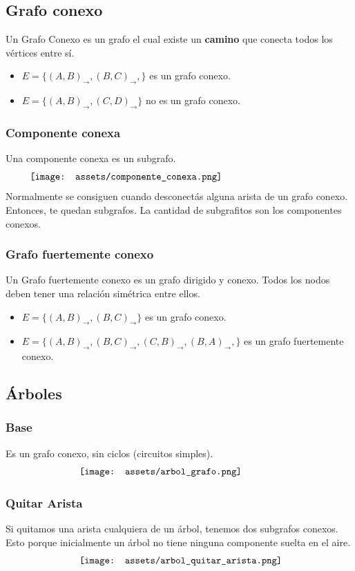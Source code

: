 \documentclass[10pt,a4paper]{article}
\begin{document}
\subsection*{Grafo conexo}
Un Grafo Conexo es un grafo el cual existe un \textbf{camino} que conecta todos los vértices entre sí. 
\begin{itemize}
    \item $E = \{(A,B)_{\rightarrow}, (B, C)_{\rightarrow}, \}$ es un grafo conexo.
    \item $E = \{(A, B)_{\rightarrow}, (C, D)_{\rightarrow}\}$ no es un grafo conexo.
\end{itemize}
\subsubsection*{Componente conexa}
Una componente conexa es un subgrafo.
\[\begin{minipage}[b]{0.9\textwidth}
    \texttt{[image: assets/componente\_conexa.png]}
\end{minipage}\]
Normalmente se consiguen cuando desconectás alguna arista de un grafo conexo. Entonces, te quedan subgrafos. La cantidad de subgrafitos son los componentes conexos.
\subsubsection*{Grafo fuertemente conexo}
Un Grafo fuertemente conexo es un grafo dirigido y conexo. Todos los nodos deben tener una relación simétrica entre ellos.
\begin{itemize}
    \item $E = \{(A,B)_{\rightarrow}, (B, C)_{\rightarrow}\}$ es un grafo conexo.
    \item $E = \{(A, B)_{\rightarrow}, (B, C)_{\rightarrow}, (C, B)_{\rightarrow}, (B, A)_{\rightarrow},\}$ es un grafo fuertemente conexo.
\end{itemize}
\subsection*{Árboles}
\subsubsection*{Base}
Es un grafo conexo, sin ciclos (circuitos simples).
\[\begin{minipage}[b]{0.6\textwidth}
    \texttt{[image: assets/arbol\_grafo.png]}
\end{minipage}\]
\subsubsection*{Quitar Arista}
Si quitamos una arista cualquiera de un árbol, tenemos dos subgrafos conexos. Esto porque inicialmente un árbol no tiene ninguna componente suelta en el aire. 
\[\begin{minipage}[b]{0.6\textwidth}
    \texttt{[image: assets/arbol\_quitar\_arista.png]}
\end{minipage}\]
\end{document}
